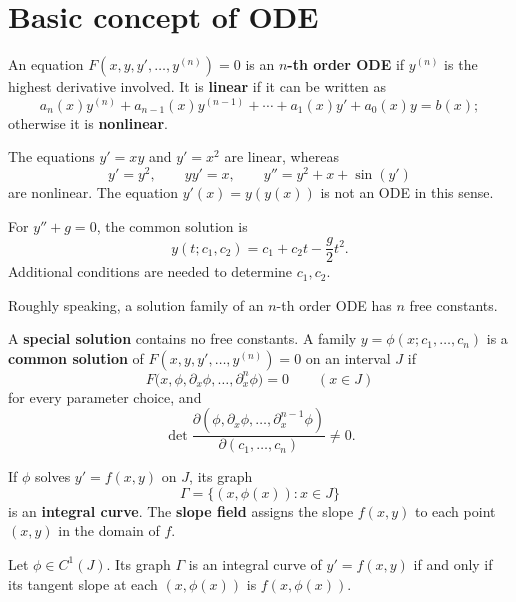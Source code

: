 \section{Basic concept of ODE}

\begin{definitionenv}
An equation $F(x,y,y',\ldots,y^{(n)})=0$ is an \textbf{$n$-th order ODE}
if $y^{(n)}$ is the highest derivative involved.
It is \textbf{linear} if it can be written as
\[
    a_n(x)y^{(n)}+a_{n-1}(x)y^{(n-1)}+\cdots+a_1(x)y'+a_0(x)y=b(x);
\]
otherwise it is \textbf{nonlinear}.
\end{definitionenv}

\begin{exampleenv}
The equations $y'=xy$ and $y'=x^2$ are linear, whereas
\[
    y'=y^2,\qquad yy'=x,\qquad y''=y^2+x+\sin(y')
\]
are nonlinear. The equation $y'(x)=y(y(x))$ is not an ODE in this sense.
\end{exampleenv}

\begin{exampleenv}
For $y''+g=0$, the common solution is
\[
    y(t;c_1,c_2)=c_1+c_2t-\frac g2t^2.
\]
Additional conditions are needed to determine $c_1,c_2$.
\end{exampleenv}

\begin{remark}
Roughly speaking, a solution family of an $n$-th order ODE has $n$ free constants.
\end{remark}

\begin{definitionenv}
A \textbf{special solution} contains no free constants.
A family $y=\phi(x;c_1,\ldots,c_n)$ is a \textbf{common solution} of
$F(x,y,y',\ldots,y^{(n)})=0$ on an interval $J$ if
\[
    F\bigl(x,\phi,\partial_x\phi,\ldots,\partial_x^n\phi\bigr)=0
    \qquad(x\in J)
\]
for every parameter choice, and
\[
    \det\frac{\partial(\phi,\partial_x\phi,\ldots,\partial_x^{n-1}\phi)}
                  {\partial(c_1,\ldots,c_n)}\ne0.
\]
\end{definitionenv}

\begin{definitionenv}
If $\phi$ solves $y'=f(x,y)$ on $J$, its graph
\[
    \Gamma=\{(x,\phi(x)):x\in J\}
\]
is an \textbf{integral curve}. The \textbf{slope field} assigns the slope
$f(x,y)$ to each point $(x,y)$ in the domain of $f$.
\end{definitionenv}

\begin{theoremenv}
Let $\phi\in C^1(J)$. Its graph $\Gamma$ is an integral curve of
$y'=f(x,y)$ if and only if its tangent slope at each $(x,\phi(x))$ is
$f(x,\phi(x))$.
\end{theoremenv}

